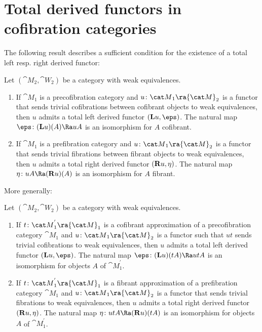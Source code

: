 \section{Total derived functors in cofibration categories}
\label{sec:leftrightderivedcofcat}

The following result describes a sufficient condition for the existence of a total left resp. right derived functor:

\begin{thm}
\label{thm:existenceleftderived}
Let $({\cat M}_2, {\cat W}_2)$ be a category with weak equivalences.
\begin{enumerate}
\item
If ${\cat M}_1$ is a precofibration category and $u \colon {\cat M}_1 \ra {\cat M}_2$ is a functor that sends trivial cofibrations between cofibrant objects to weak equivalences, then $u$ admits a total left derived functor $({\bf L}u, \eps)$. The natural map $\eps \colon ({\bf L}u)(A) \Ra uA$ is an isomorphism for $A$ cofibrant.
\item
If ${\cat M}_1$ is a prefibration category and $u \colon {\cat M}_1 \ra {\cat M}_2$ is a functor that sends trivial fibrations between fibrant objects to weak equivalences, then $u$ admits a total right derived functor $({\bf R}u, \eta)$. The natural map $\eta \colon uA \Ra ({\bf R}u)(A)$ is an isomorphism for $A$ fibrant.
\end{enumerate}
\end{thm}

More generally:
\begin{thm}
\label{thm:existenceleftderivedapprox}
Let $({\cat M}_2, {\cat W}_2)$ be a category with weak equivalences.
\begin{enumerate}
\item
If $t \colon {\cat M}^{'}_1 \ra {\cat M}_1$ is a cofibrant approximation of a precofibration category ${\cat M}_1$ and $u \colon {\cat M}_1 \ra {\cat M}_2$ is a functor such that $ut$ sends trivial cofibrations to weak equivalences, then $u$ admits a total left derived functor $({\bf L}u, \eps)$. The natural map $\eps \colon ({\bf L}u)(tA) \Ra utA$ is an isomorphism for objects $A$ of ${\cat M}^{'}_1$.
\item
If $t \colon {\cat M}^{'}_1 \ra {\cat M}_1$ is a fibrant approximation of a prefibration category ${\cat M}_1$ and $u \colon {\cat M}_1 \ra {\cat M}_2$ is a functor that sends trivial fibrations to weak equivalences, then $u$ admits a total right derived functor $({\bf R}u, \eta)$. The natural map $\eta \colon utA \Ra ({\bf R}u)(tA)$ is an isomorphism for objects $A$ of ${\cat M}^{'}_1$.
\end{enumerate}
\end{thm}

